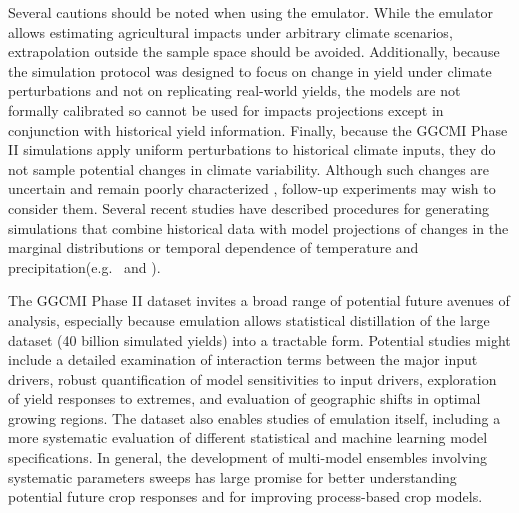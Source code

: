 \documentclass[gmd, manuscript]{copernicus} %
\begin{document}
Several cautions should be noted when using the emulator. While the emulator allows estimating agricultural impacts under arbitrary climate scenarios, extrapolation outside the sample space should be avoided. 
Additionally, because the simulation protocol was designed to focus on change in yield under climate perturbations and not on replicating real-world yields, the models are not formally calibrated so cannot be used for impacts projections except in conjunction with historical yield information. 
Finally, because the GGCMI Phase II simulations apply uniform perturbations to historical climate inputs, they do not sample potential changes in climate variability. 
Although such changes are uncertain and remain poorly characterized \citep[e.g.][]{Alexande2006, Kodra2014}, follow-up experiments may wish to consider them. 
Several recent studies have described procedures for generating simulations that combine historical data with model projections of changes in the marginal distributions or temporal dependence of temperature and precipitation(e.g.\ \citet{Leeds2015, poppick2016, Won16} and \citet{Haugen2018}).

The GGCMI Phase II dataset invites a broad range of potential future avenues of analysis, especially because emulation allows statistical distillation of the large dataset (40 billion simulated yields) into a tractable form. 
Potential studies might include a detailed examination of interaction terms between the major input drivers, robust quantification of model sensitivities to input drivers, exploration of yield responses to extremes, and evaluation of geographic shifts in optimal growing regions. 
The dataset also enables studies of emulation itself, including a more systematic evaluation of different statistical and machine learning model specifications.
In general, the development of multi-model ensembles involving systematic parameters sweeps has large promise for better understanding potential future crop responses and for improving process-based crop models.


\end{document}
